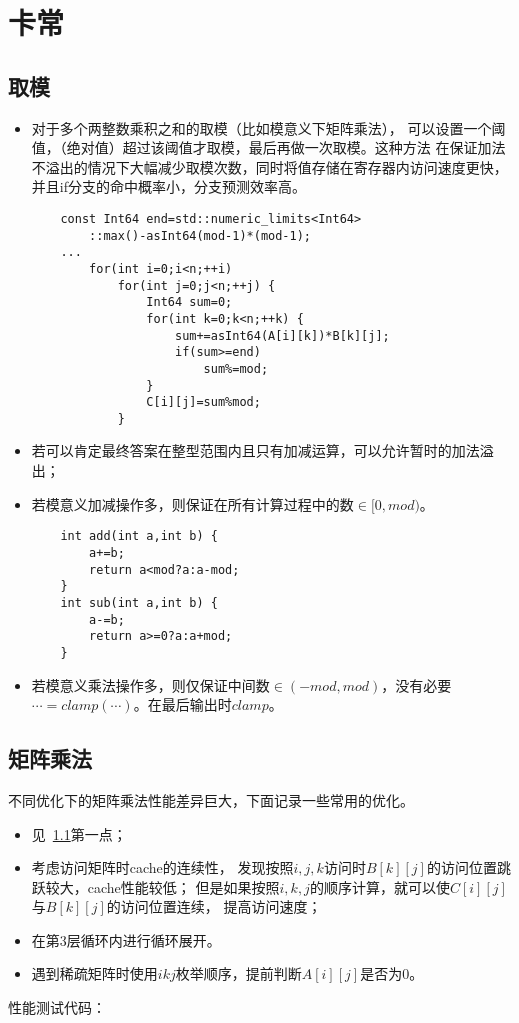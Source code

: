 \section{卡常}
\subsection{取模}\label{mod}
\begin{itemize}
    \item 对于多个两整数乘积之和的取模（比如模意义下矩阵乘法），
    可以设置一个阈值，（绝对值）超过该阈值才取模，最后再做一次取模。这种方法
    在保证加法不溢出的情况下大幅减少取模次数，同时将值存储在寄存器内访问速度更快，
    并且if分支的命中概率小，分支预测效率高。
    \begin{lstlisting}
    const Int64 end=std::numeric_limits<Int64>
        ::max()-asInt64(mod-1)*(mod-1);
    ...
        for(int i=0;i<n;++i)
            for(int j=0;j<n;++j) {
                Int64 sum=0;
                for(int k=0;k<n;++k) {
                    sum+=asInt64(A[i][k])*B[k][j];
                    if(sum>=end)
                        sum%=mod;
                }
                C[i][j]=sum%mod;
            }
    \end{lstlisting}
    \item 若可以肯定最终答案在整型范围内且只有加减运算，可以允许暂时的加法溢出；
    \item 若模意义加减操作多，则保证在所有计算过程中的数$\in[0,mod)$。
    \begin{lstlisting}
    int add(int a,int b) {
        a+=b;
        return a<mod?a:a-mod;
    }
    int sub(int a,int b) {
        a-=b;
        return a>=0?a:a+mod;
    }
    \end{lstlisting}
    \item 若模意义乘法操作多，则仅保证中间数$\in (-mod,mod)$，没有必要
    $\cdots =clamp(\cdots)$。在最后输出时$clamp$。
\end{itemize}
\subsection{矩阵乘法}
不同优化下的矩阵乘法性能差异巨大，下面记录一些常用的优化。
\begin{itemize}
    \item 见~\ref{mod}第一点；
    \item 考虑访问矩阵时cache的连续性，
    发现按照$i,j,k$访问时$B[k][j]$的访问位置跳跃较大，cache性能较低；
    但是如果按照$i,k,j$的顺序计算，就可以使$C[i][j]$与$B[k][j]$的访问位置连续，
    提高访问速度；
    \item 在第3层循环内进行循环展开。
    \item 遇到稀疏矩阵时使用$ikj$枚举顺序，提前判断$A[i][j]$是否为0。
\end{itemize}
性能测试代码：


